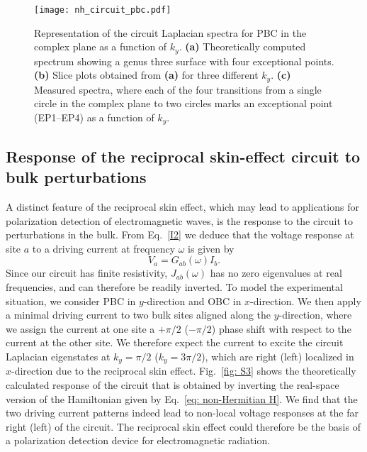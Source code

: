 \begin{figure}[!htbp]
\centering
\texttt{[image: nh\_circuit\_pbc.pdf]}
\caption[Representation of the circuit Laplacian spectra for periodic boundary conditions in the complex plane as a function of $k_y$]{Representation of the circuit Laplacian spectra for PBC in the complex plane as a function of $k_y$. \textbf{(a)} Theoretically computed spectrum showing a genus three surface with four exceptional points. \textbf{(b)} Slice plots obtained from \textbf{(a)} for three different $k_y$. \textbf{(c)} Measured spectra, where each of the four transitions from a single circle in the complex plane to two circles marks an exceptional point (EP1--EP4) as a function of $k_y$. }
\label{fig: S2}
\end{figure}

\subsection{Response of the reciprocal skin-effect circuit to bulk perturbations}
\label{sec: response}
A distinct feature of the reciprocal skin effect, which may lead to applications for polarization detection of electromagnetic waves, is the response to the circuit to perturbations in the bulk. From Eq.~\eqref{I2} we deduce that the voltage response at site $a$ to a driving current at frequency $\omega$ is given by
\begin{equation}
V_a=G_{ab}(\omega)I_b.
\end{equation}
Since our circuit has finite resistivity, $J_{ab}(\omega)$ has no zero eigenvalues at real frequencies, and can therefore be readily inverted. To model the experimental situation, we consider PBC in $y$-direction and OBC in $x$-direction. We then apply a minimal driving current to two bulk sites aligned along the $y$-direction, where we assign the current at one site a $+\pi/2$ ($-\pi/2$) phase shift with respect to the current at the other site. We therefore expect the current to excite the circuit Laplacian eigenstates at $k_y = \pi/2$ ($k_y = 3\pi/2$), which are right (left) localized in $x$-direction due to the reciprocal skin effect. Fig.~\ref{fig: S3} shows the theoretically calculated response of the circuit that is obtained by inverting the real-space version of the Hamiltonian given by Eq.~\eqref{eq: non-Hermitian H}. We find that the two driving current patterns indeed lead to non-local voltage responses at the far right (left) of the circuit. The reciprocal skin effect could therefore be the basis of a polarization detection device for electromagnetic radiation.

